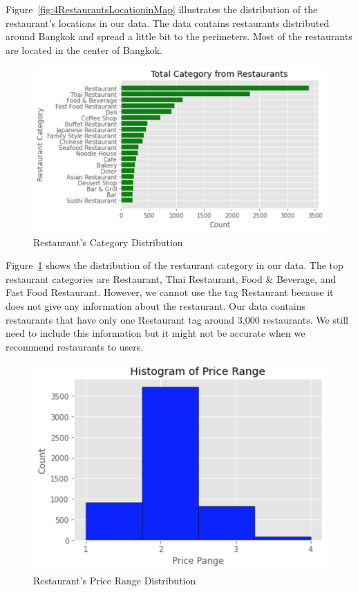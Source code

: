 \documentclass[12pt,oneside,openright,a4paper]{cpe-english-project}
\begin{document}
Figure~\ref{fig:4RestaurantsLocationinMap} illustrates the distribution of the restaurant’s locations in our data. The data contains restaurants distributed around Bangkok and spread a little bit to the perimeters. Most of the restaurants are located in the center of Bangkok.

\begin{figure}[H]\centering
\includegraphics[width=350pt]{./images/4RestaurantsCategoryDistribution.png}
\caption{Restaurant’s Category Distribution}\label{fig:4RestaurantsCategoryDistribution}
\end{figure}\vspace{-24pt}

Figure~\ref{fig:4RestaurantsCategoryDistribution} shows the distribution of the restaurant category in our data. The top restaurant categories are Restaurant, Thai Restaurant, Food \& Beverage, and Fast Food Restaurant. However, we cannot use the tag Restaurant because it does not give any information about the restaurant. Our data contains restaurants that have only one Restaurant tag around 3,000 restaurants. We still need to include this information but it might not be accurate when we recommend restaurants to users.

\begin{figure}[H]\centering
\includegraphics[width=350pt]{./images/4RestaurantsPriceRangeDistribution.png}
\caption{Restaurant’s Price Range Distribution}\label{fig:4RestaurantsPriceRangeDistribution}
\end{figure}\vspace{-24pt}
\end{document}
